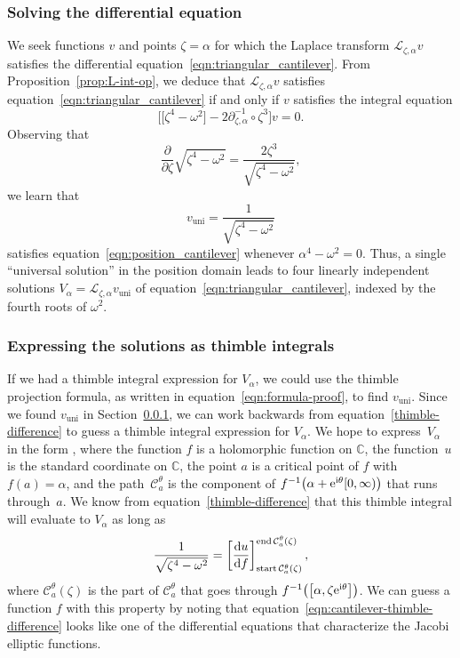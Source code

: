 \documentclass[10pt,a4paper]{amsart}
\newcommand{\C}{\mathbb{C}}
\newcommand{\fracderiv}[3]{\partial^{#1}_{#2, #3}}
\newcommand{\laplace}{\mathcal{L}}
\numberwithin{equation}{section}
\begin{document}
\subsubsection{Solving the differential equation}\label{sec:solve-cantilever-eqn}
We seek functions $v$ and points $\zeta = \alpha$ for which the Laplace transform $\laplace_{\zeta, \alpha} v$ satisfies the differential equation~\eqref{eqn:triangular_cantilever}. From Proposition~\ref{prop:L-int-op}, we deduce that $\laplace_{\zeta, \alpha} v$ satisfies equation~\eqref{eqn:triangular_cantilever} if and only if $v$ satisfies the integral equation
\begin{equation}\label{eqn:position_cantilever}
\bigl[ \bigl[ \zeta^4 - \omega^2 \bigr] - 2\fracderiv{-1}{\zeta}{\alpha} \circ \zeta^3 \bigr] v = 0.
\end{equation}
Observing that
\[ \frac{\partial}{\partial \zeta} \sqrt{\zeta^4 - \omega^2} = \frac{2\zeta^3}{\sqrt{\zeta^4 - \omega^2}}, \]
we learn that
\[
v_\text{uni} = \frac{1}{\sqrt{\zeta^4 - \omega^2}}
\]
satisfies equation~\eqref{eqn:position_cantilever} whenever $\alpha^4 - \omega^2 = 0$. Thus, a single ``universal solution'' in the position domain leads to four linearly independent solutions $V_\alpha = \laplace_{\zeta, \alpha} v_\text{uni}$ of equation~\eqref{eqn:triangular_cantilever}, indexed by the fourth roots of $\omega^2$.
\subsubsection{Expressing the solutions as thimble integrals}
If we had a thimble integral expression for $V_\alpha$, we could use the thimble projection formula, as written in equation~\eqref{eqn:formula-proof}, to find $v_\text{uni}$. Since we found $v_\text{uni}$ in Section~\ref{sec:solve-cantilever-eqn}, we can work backwards from equation~\eqref{thimble-difference} to guess a thimble integral expression for $V_\alpha$. We hope to express~$V_\alpha$ in the form
,
where the function $f$ is a holomorphic function on $\C$, the function~$u$ is the standard coordinate on $\C$, the point $a$ is a critical point of $f$ with $f(a) = \alpha$, and the path~$\mathcal{C}_a^\theta$ is the component of $f^{-1}\bigl(\alpha + {\rm e}^{{\rm i}\theta}[0, \infty)\bigr)$ that runs through~$a$. We know from equation~\eqref{thimble-difference} that this thimble integral will evaluate to $V_\alpha$ as long as
\begin{equation}\label{eqn:cantilever-thimble-difference}
\frac{1}{\sqrt{\zeta^4-\omega^2}} = \left[\frac{{\rm d}u}{{\rm d}f}\right]_{\operatorname{start} \mathcal{C}_a^\theta(\zeta)}^{\operatorname{end} \mathcal{C}_a^\theta(\zeta)},
\end{equation}
where $\mathcal{C}_a^\theta(\zeta)$ is the part of $\mathcal{C}_a^\theta$ that goes through $f^{-1}\bigl(\bigl[\alpha,\zeta {\rm e}^{{\rm i}\theta}\bigr]\bigr)$. We can guess a function $f$ with this property by noting that equation~\eqref{eqn:cantilever-thimble-difference} looks like one of the differential equations that characterize the Jacobi elliptic functions.
\end{document}
